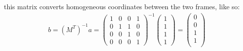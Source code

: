 \documentclass[11pt]{article}  %
\begin{document}
    this matrix converts homogeneous coordinates between the two frames, like so:
    \begin{align*}
        b=(M^T)^{-1}a=
        \begin{pmatrix}
            1 & 0 & 0 & 1\\
            0 & 1 & 1 & 0\\
            0 & 0 & 1 & 0\\
            0 & 0 & 0 & 1
        \end{pmatrix}^{-1}
        \begin{pmatrix}
            1\\1\\1\\1
        \end{pmatrix}=
        \begin{pmatrix}
            0\\0\\1\\1\\
        \end{pmatrix}
    \end{align*}

    \vfill
    \doclicenseThis
\end{document}
